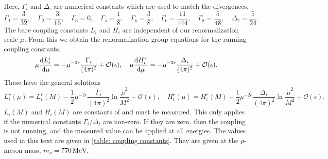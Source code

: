 %
Here, $\Gamma_i$ and $\Delta_i$ are numerical constants which are used to match the divergences.
\begin{equation}
    \Gamma_1 = \frac{3}{32}, \quad
    \Gamma_2 = \frac{3}{16}, \quad
    \Gamma_3 = 0, \quad
    \Gamma_4 = \frac{1}{8}, \quad
    \Gamma_5 = \frac{3}{8}, \quad
    \Gamma_6 = \frac{11}{144}, \quad
    \Gamma_8 = \frac{5}{48}, \quad
    \Delta_2 = \frac{5}{24}.
\end{equation}
%
The bare coupling constants $L_i$ and $H_i$ are independent of our renormalization scale $\mu$.
From this we obtain the renormalization group equations for the running coupling constants,
\begin{equation}
    \mu \diff{L_i^r}{\mu } 
    = - \mu^{-2\epsilon} \frac{\Gamma_i }{(4 \pi)^2} + \mathcal{O}(\epsilon), \quad
    \mu \diff{H_i^r}{\mu } 
    = -  \mu^{-2\epsilon}\frac{\Delta_i}{(4 \pi)^2}+ \mathcal{O}(\epsilon).
\end{equation}
%
These have the general solutions
%
\begin{equation}
    L_i^r(\mu)
    = 
    L_i^r(M)
    - \frac{1}{2} \mu^{-2\epsilon} \frac{\Gamma_i}{(4 \pi)^2} 
    \ln{\frac{\tilde \mu^2}{M^2}} + \mathcal{O}(\epsilon),
    \quad
    H_i^r (\mu)
    = 
    H_i^r (M)
    - \frac{1}{2} \mu^{-2\epsilon} \frac{\Delta_i}{(4 \pi)^2} 
    \ln{\frac{\tilde \mu^2}{M^2}} + \mathcal{O}(\epsilon).
\end{equation}
%
$L_i(M)$ and $H_i(M)$ are constants of and must be measured.
This only applies if the numerical constants $\Gamma_i$/$\Delta_i$ are non-zero.
If they are zero, then the coupling is not running, and the measured value can be applied at all energies.
The values used in this text are given in \autoref{table: coupling constants}.
They are given at the $\rho$-meson mass, $m_\rho = 770\, \text{MeV}$.
%
